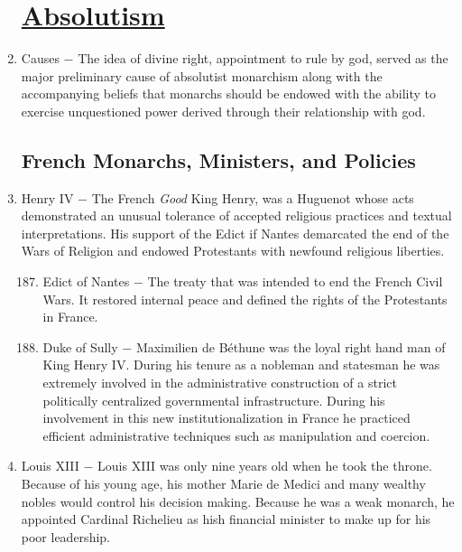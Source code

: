 \documentclass[12pt]{article}
\begin{document}
\begin{enumerate}
\section{\underline{Absolutism}}

\item Causes $-$ The idea of divine right, appointment to rule by god, served as the major preliminary cause of absolutist monarchism along with the accompanying beliefs that monarchs should be endowed with the ability to exercise unquestioned power derived through their relationship with god.

\subsection{French Monarchs, Ministers, and Policies}

\item Henry IV $-$ The French \textit{Good} King Henry, was a Huguenot whose acts demonstrated an unusual tolerance of accepted religious practices and textual interpretations. His support of the Edict if Nantes demarcated the end of the Wars of Religion and endowed Protestants with newfound religious liberties.

\begin{enumerate}[label=\arabic{*}.]
\setcounter{enumii}{186}

\item Edict of Nantes $-$ The treaty that was intended to end the French Civil Wars. It restored internal peace and defined the rights of the Protestants in France. %

\item Duke of Sully $-$ Maximilien de B\'ethune was the loyal right hand man of King Henry IV. During his tenure as a nobleman and statesman he was extremely involved in the administrative construction of a strict politically centralized governmental infrastructure. During his involvement in this new institutionalization in France he practiced efficient administrative techniques such as manipulation and coercion. 

\end{enumerate} 
\setcounter{enumi}{188}

\item Louis XIII $-$ Louis XIII was only nine years old when he took the throne. Because of his young age, his mother Marie de Medici and many wealthy nobles would control his decision making. Because he was a weak monarch, he appointed Cardinal Richelieu as hish financial minister to make up for his poor leadership.


\end{enumerate}
\end{document}
